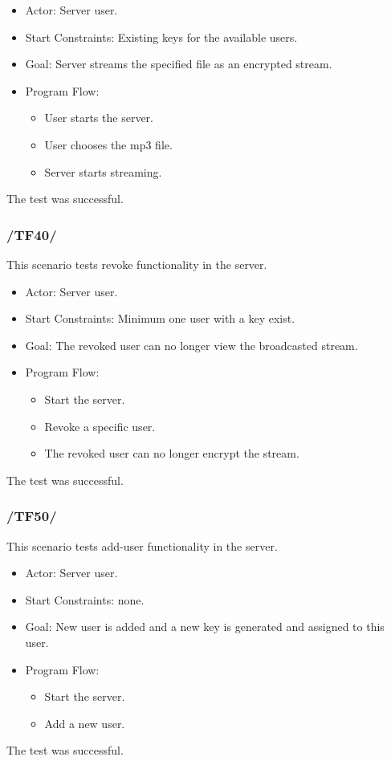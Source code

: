 \documentclass[a4paper,10pt]{scrartcl}
\begin{document}
\begin{itemize}
	\item Actor: Server user.
	\item Start Constraints: Existing keys for the available users.
	\item Goal: Server streams the specified file as an encrypted stream.
	\item Program Flow:
	\begin{itemize}
   \item User starts the server.
   \item User chooses the mp3 file.
   \item Server starts streaming.
\end{itemize}
\end{itemize}
The test was successful.

\subsubsection{/TF40/}
This scenario tests revoke functionality in the server.

\begin{itemize}
	\item Actor: Server user.
	\item Start Constraints: Minimum one user with a key exist.
	\item Goal: The revoked user can no longer view the broadcasted stream.
	\item Program Flow:
	\begin{itemize}
   \item Start the server.
   \item Revoke a specific user.
   \item The revoked user can no longer encrypt the stream.
\end{itemize}
\end{itemize}
The test was successful.


\subsubsection{/TF50/}
This scenario tests add-user functionality in the server.

\begin{itemize}
	\item Actor: Server user.
	\item Start Constraints: none.
	\item Goal: New user is added and a new key is generated and assigned to this user.
	\item Program Flow:
	\begin{itemize}
   \item Start the server.
   \item Add a new user.
\end{itemize}
\end{itemize}
The test was successful.
\end{document}
